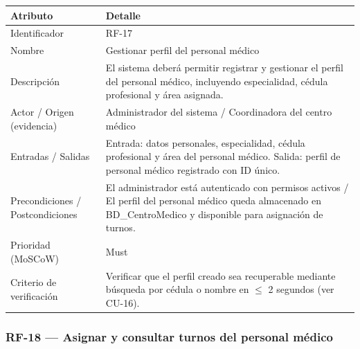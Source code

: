\documentclass[11pt,a4paper]{article}
\begin{document}
	\begin{longtable}{p{} p{}}
		
		\toprule
		\textbf{Atributo} & \textbf{Detalle} \\
		\midrule
		\endhead
		
		Identificador & RF-17 \\
		Nombre & Gestionar perfil del personal médico \\
		Descripción & El sistema deberá permitir registrar y gestionar el perfil del personal médico, incluyendo especialidad, cédula profesional y área asignada. \\
		Actor / Origen (evidencia) & Administrador del sistema / Coordinadora del centro médico \\
		Entradas / Salidas & Entrada: datos personales, especialidad, cédula profesional y área del personal médico. Salida: perfil de personal médico registrado con ID único. \\
		Precondiciones / Postcondiciones & El administrador está autenticado con permisos activos / El perfil del personal médico queda almacenado en BD\_CentroMedico y disponible para asignación de turnos. \\
		Prioridad (MoSCoW) & Must \\
		Criterio de verificación & Verificar que el perfil creado sea recuperable mediante búsqueda por cédula o nombre en \(\leq\) 2 segundos (ver CU-16). \\
		\bottomrule
	\end{longtable}
	
	\subsubsection{RF-18 --- Asignar y consultar turnos del personal médico}
	
\end{document}
